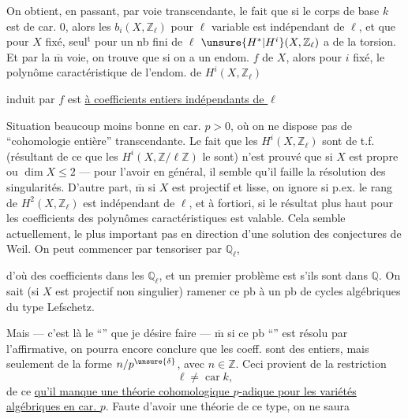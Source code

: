 On obtient, en passant, par voie transcendante, le fait que si le corps de base $k$ est de car. $0$, alors les  $b_i(X,\mathbb Z_\ell)$  pour $\ell$ variable est indépendant de $\ell$, et que pour $X$ fixé, seul$^{\mathrm t}$ pour un nb fini de $\ell$  $\unsure{H^*|H^i}(X,\mathbb Z_\ell)$ a de la torsion.
Et par la $\overline{\mathrm m}$ voie, on trouve  que si on a un endom. $f$ de $X$, alors pour $i$ fixé,  le polynôme caractéristique de l'endom. de $H^i(X,\mathbb Z_\ell)$

induit par $f$ est \uline{à coefficients entiers indépendants de $\ell$}

Situation beaucoup moins bonne en car. $p>0$, où on ne dispose pas de ``cohomologie entière'' transcendante.
Le fait que les $H^i(X,\mathbb Z_\ell)$ sont de t.f. (résultant de ce que les $H^i(X,\mathbb Z/\ell\mathbb Z)$ le sont) n'est prouvé que si $X$ est propre ou $\dim X\leq 2$ — pour l'avoir en général, il semble qu'il faille la résolution des singularités.
D'autre part, $\overline{\mathrm m}$ si $X$ est projectif et lisse, on ignore si p.ex. le rang de $H^2(X,\mathbb Z_\ell)$ est indépendant de $\ell$, et à fortiori, si le résultat plus haut pour les coefficients des polynômes caractéristiques est valable.
Cela semble actuellement,  le  plus important pas  en direction d'une solution des conjectures de Weil.
 On peut commencer par tensoriser par $\mathbb Q_\ell$,


d'où des coefficients dans les $\mathbb Q_\ell$, et un premier problème est s'ils sont dans $\mathbb Q$. On sait (si $X$ est projectif non singulier) ramener ce pb à un pb de cycles algébriques du type Lefschetz.

Mais --- c'est là le ``'' que je désire faire --- $\overline{\mathrm m}$ si ce pb ``''  est résolu par l'affirmative, on  pourra encore conclure que les coeff. sont des entiers, mais seulement  de  la forme $n/p^{\unsure{\delta}}$, avec $n\in\mathbb Z$. Ceci provient de la restriction
\[
\ell\ne\operatorname{car} k,
\]
de ce \uline{qu'il manque une théorie cohomologique $p$-adique pour les variétés algébriques en car. $p$}. Faute d'avoir une théorie de ce type, on ne saura

